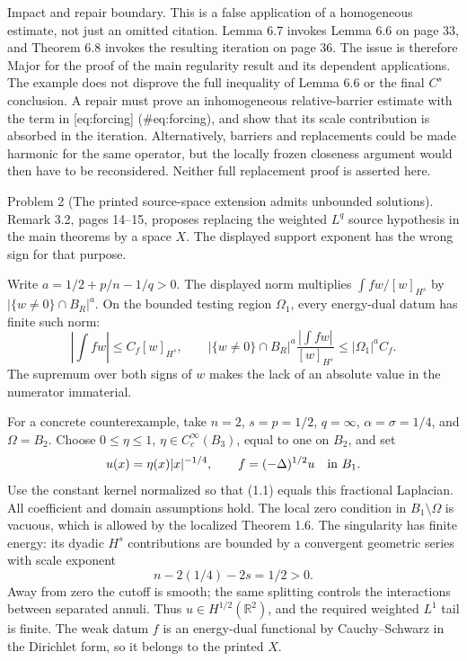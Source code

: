 \documentclass[10pt]{article}
\begin{document}
Impact and repair boundary. This is a false application of a homogeneous estimate, not just an omitted citation. Lemma 6.7 invokes Lemma 6.6 on page 33, and Theorem 6.8 invokes the resulting iteration on page 36. The issue is therefore Major for the proof of the main regularity result and its dependent applications. The example does not disprove the full inequality of Lemma 6.6 or the final \(C^s\) conclusion. A repair must prove an inhomogeneous relative-barrier estimate with the term in [eq:forcing] (\#eq:forcing), and show that its scale contribution is absorbed in the iteration. Alternatively, barriers and replacements could be made harmonic for the same operator, but the locally frozen closeness argument would then have to be reconsidered. Neither full replacement proof is asserted here.\par
Problem 2 (The printed source-space extension admits unbounded solutions).  Remark 3.2, pages 14–15, proposes replacing the weighted \(L^q\) source hypothesis in the main theorems by a space \(X\). The displayed support exponent has the wrong sign for that purpose.\par
Write \(a=1/2+p/n-1/q>0\). The displayed norm multiplies \(\int fw/[w]_{H^s}\) by \(|\{w\ne0\}\cap B_R|^{a}\). On the bounded testing region \(\Omega_1\), every energy-dual datum has finite such norm: \[\left|\int fw\right|\le C_f[w]_{H^s},
 \qquad
 |\{w\ne0\}\cap B_R|^a
       \frac{\left|\int fw\right|}{[w]_{H^s}}
 \le |\Omega_1|^a C_f .\] The supremum over both signs of \(w\) makes the lack of an absolute value in the numerator immaterial.\par
For a concrete counterexample, take \(n=2\), \(s=p=1/2\), \(q=\infty\), \(\alpha=\sigma=1/4\), and \(\Omega=B_2\). Choose \(0\le\eta\le1\), \(\eta\in C_c^\infty(B_3)\), equal to one on \(B_2\), and set \[u(x)=\eta(x)|x|^{-1/4},\qquad f=(-\Delta)^{1/2}u
       \quad\hbox{in }B_1 .\] Use the constant kernel normalized so that (1.1) equals this fractional Laplacian. All coefficient and domain assumptions hold. The local zero condition in \(B_1\setminus\Omega\) is vacuous, which is allowed by the localized Theorem 1.6. The singularity has finite energy: its dyadic \(H^s\) contributions are bounded by a convergent geometric series with scale exponent \[n-2(1/4)-2s=1/2>0 .\] Away from zero the cutoff is smooth; the same splitting controls the interactions between separated annuli. Thus \(u\in H^{1/2}(\mathbb R^2)\), and the required weighted \(L^1\) tail is finite. The weak datum \(f\) is an energy-dual functional by Cauchy–Schwarz in the Dirichlet form, so it belongs to the printed \(X\).\par
\end{document}
